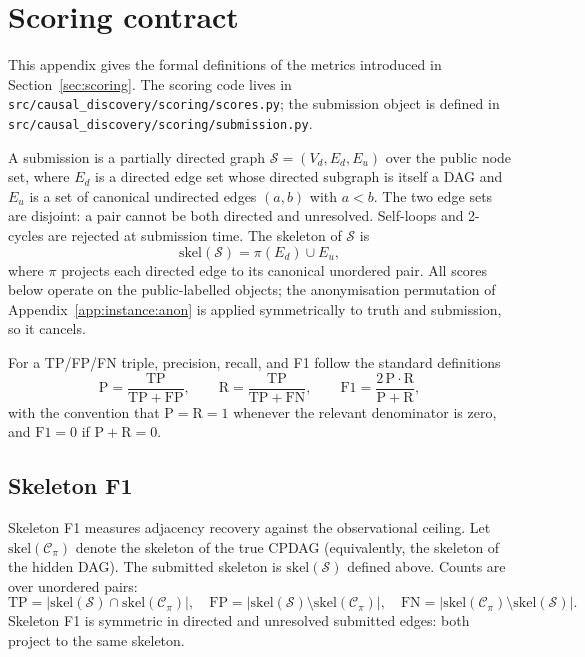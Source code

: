\section{Scoring contract}
\label{app:scoring}

This appendix gives the formal definitions of the metrics introduced in Section~\ref{sec:scoring}. The scoring code lives in \texttt{src/causal\_discovery/scoring/scores.py}; the submission object is defined in \texttt{src/causal\_discovery/scoring/submission.py}.

A submission is a partially directed graph $\mathcal{S} = (V_d, E_d, E_u)$ over the public node set, where $E_d$ is a directed edge set whose directed subgraph is itself a DAG and $E_u$ is a set of canonical undirected edges $(a, b)$ with $a < b$. The two edge sets are disjoint: a pair cannot be both directed and unresolved. Self-loops and 2-cycles are rejected at submission time. The skeleton of $\mathcal{S}$ is
\begin{equation}
\mathrm{skel}(\mathcal{S}) = \pi(E_d) \cup E_u,
\end{equation}
where $\pi$ projects each directed edge to its canonical unordered pair. All scores below operate on the public-labelled objects; the anonymisation permutation of Appendix~\ref{app:instance:anon} is applied symmetrically to truth and submission, so it cancels.

For a TP/FP/FN triple, precision, recall, and F1 follow the standard definitions
\begin{equation}
\mathrm{P} = \frac{\mathrm{TP}}{\mathrm{TP} + \mathrm{FP}}, \qquad
\mathrm{R} = \frac{\mathrm{TP}}{\mathrm{TP} + \mathrm{FN}}, \qquad
\mathrm{F1} = \frac{2 \, \mathrm{P} \cdot \mathrm{R}}{\mathrm{P} + \mathrm{R}},
\end{equation}
with the convention that $\mathrm{P} = \mathrm{R} = 1$ whenever the relevant denominator is zero, and $\mathrm{F1} = 0$ if $\mathrm{P} + \mathrm{R} = 0$.

\subsection{Skeleton F1}
\label{app:scoring:skeleton}

Skeleton F1 measures adjacency recovery against the observational ceiling. Let $\mathrm{skel}(\mathcal{C}_\pi)$ denote the skeleton of the true CPDAG (equivalently, the skeleton of the hidden DAG). The submitted skeleton is $\mathrm{skel}(\mathcal{S})$ defined above. Counts are over unordered pairs:
\begin{equation}
\mathrm{TP} = |\mathrm{skel}(\mathcal{S}) \cap \mathrm{skel}(\mathcal{C}_\pi)|, \quad
\mathrm{FP} = |\mathrm{skel}(\mathcal{S}) \setminus \mathrm{skel}(\mathcal{C}_\pi)|, \quad
\mathrm{FN} = |\mathrm{skel}(\mathcal{C}_\pi) \setminus \mathrm{skel}(\mathcal{S})|.
\end{equation}
Skeleton F1 is symmetric in directed and unresolved submitted edges: both project to the same skeleton.

